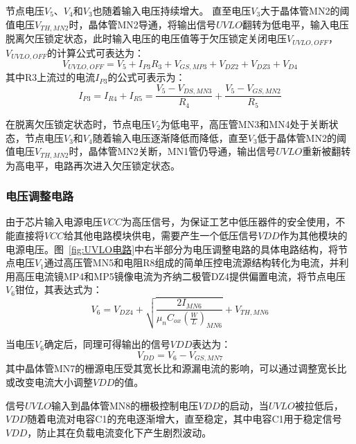 节点电压$V_5$、$V_4$和$V_3$也随着输入电压持续增大。
直至电压$V_3$大于晶体管MN2的阈值电压$V_{TH,MN2}$时，晶体管MN2导通，将输出信号$UVLO$翻转为低电平，输入电压脱离欠压锁定状态，此时输入电压的电压值等于欠压锁定关闭电压$V_{UVLO,OFF}$，$V_{UVLO,OFF}$的计算公式可表达为：
\begin{equation}
    \label{eq:V_UVLO,OFF公式}
    V_{UVLO,OFF} = V_5 + I_{P3}R_3 + V_{GS,MP3} + V_{DZ2} + V_{DZ3} + V_{D4}  
\end{equation}
其中R3上流过的电流$I_{P3}$的公式可表示为：
\begin{equation}
    \label{eq:IR3公式}
    I_{P3} = I_{R4} + I_{R5} = \frac{V_5 - V_{DS,MN3}}{R_4} +  \frac{V_5 - V_{GS,MN2}}{R_5}
\end{equation}

在脱离欠压锁定状态时，节点电压$V_2$为低电平，高压管MN3和MN4处于关断状态，节点电压$V_3$和$V_4$随着输入电压逐渐降低而降低，直至$V_3$低于晶体管MN2的阈值电压$V_{TH,MN2}$时，晶体管MN2关断，MN1管仍导通，输出信号$UVLO$重新被翻转为高电平，电路再次进入欠压锁定状态。

\subsubsection{电压调整电路}

由于芯片输入电源电压$VCC$为高压信号，为保证工艺中低压器件的安全使用，不能直接将$VCC$给其他电路模块供电，需要产生一个低压信号$VDD$作为其他模块的电源电压。图~\ref{fig:UVLO电路}中右半部分为电压调整电路的具体电路结构，将节点电压$V_1$通过高压管MN5和电阻R8组成的简单压控电流源结构转化为电流，并利用高压电流镜MP4和MP5镜像电流为齐纳二极管DZ4提供偏置电流，将节点电压$V_6$钳位，其表达式为：
\begin{equation}
    \label{eq:V6公式}
    V_{6} = V_{DZ4} + \sqrt{\frac{2I_{MN6}}{\mu_n C_{ox} (\frac{W}{L})_{MN6}}} + V_{TH,MN6}
\end{equation}

当电压$V_6$确定后，同理可得输出的信号$VDD$表达为：
\begin{equation}
    \label{eq:$VDD$公式}
    V_{DD} = V_6 - V_{GS,MN7}
\end{equation}
其中晶体管MN7的栅源电压受其宽长比和源漏电流的影响，可以通过调整宽长比或改变电流大小调整$VDD$的值。

信号$UVLO$输入到晶体管MN8的栅极控制电压$VDD$的启动，当$UVLO$被拉低后，$VDD$随着电流对电容C1的充电逐渐增大，直至稳定，其中电容C1用于稳定信号$VDD$，防止其在负载电流变化下产生剧烈波动。



